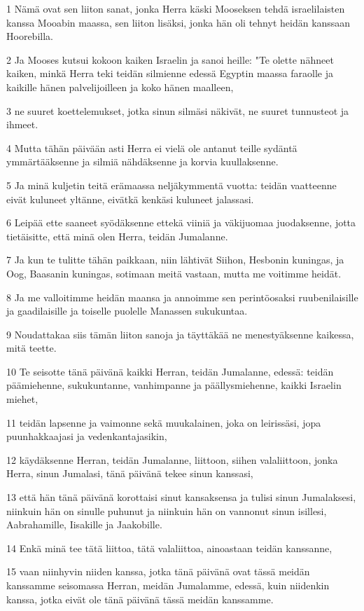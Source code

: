 \par 1 Nämä ovat sen liiton sanat, jonka Herra käski Mooseksen tehdä israelilaisten kanssa Mooabin maassa, sen liiton lisäksi, jonka hän oli tehnyt heidän kanssaan Hoorebilla.
\par 2 Ja Mooses kutsui kokoon kaiken Israelin ja sanoi heille: "Te olette nähneet kaiken, minkä Herra teki teidän silmienne edessä Egyptin maassa faraolle ja kaikille hänen palvelijoilleen ja koko hänen maalleen,
\par 3 ne suuret koettelemukset, jotka sinun silmäsi näkivät, ne suuret tunnusteot ja ihmeet.
\par 4 Mutta tähän päivään asti Herra ei vielä ole antanut teille sydäntä ymmärtääksenne ja silmiä nähdäksenne ja korvia kuullaksenne.
\par 5 Ja minä kuljetin teitä erämaassa neljäkymmentä vuotta: teidän vaatteenne eivät kuluneet yltänne, eivätkä kenkäsi kuluneet jalassasi.
\par 6 Leipää ette saaneet syödäksenne ettekä viiniä ja väkijuomaa juodaksenne, jotta tietäisitte, että minä olen Herra, teidän Jumalanne.
\par 7 Ja kun te tulitte tähän paikkaan, niin lähtivät Siihon, Hesbonin kuningas, ja Oog, Baasanin kuningas, sotimaan meitä vastaan, mutta me voitimme heidät.
\par 8 Ja me valloitimme heidän maansa ja annoimme sen perintöosaksi ruubenilaisille ja gaadilaisille ja toiselle puolelle Manassen sukukuntaa.
\par 9 Noudattakaa siis tämän liiton sanoja ja täyttäkää ne menestyäksenne kaikessa, mitä teette.
\par 10 Te seisotte tänä päivänä kaikki Herran, teidän Jumalanne, edessä: teidän päämiehenne, sukukuntanne, vanhimpanne ja päällysmiehenne, kaikki Israelin miehet,
\par 11 teidän lapsenne ja vaimonne sekä muukalainen, joka on leirissäsi, jopa puunhakkaajasi ja vedenkantajasikin,
\par 12 käydäksenne Herran, teidän Jumalanne, liittoon, siihen valaliittoon, jonka Herra, sinun Jumalasi, tänä päivänä tekee sinun kanssasi,
\par 13 että hän tänä päivänä korottaisi sinut kansaksensa ja tulisi sinun Jumalaksesi, niinkuin hän on sinulle puhunut ja niinkuin hän on vannonut sinun isillesi, Aabrahamille, Iisakille ja Jaakobille.
\par 14 Enkä minä tee tätä liittoa, tätä valaliittoa, ainoastaan teidän kanssanne,
\par 15 vaan niinhyvin niiden kanssa, jotka tänä päivänä ovat tässä meidän kanssamme seisomassa Herran, meidän Jumalamme, edessä, kuin niidenkin kanssa, jotka eivät ole tänä päivänä tässä meidän kanssamme.
